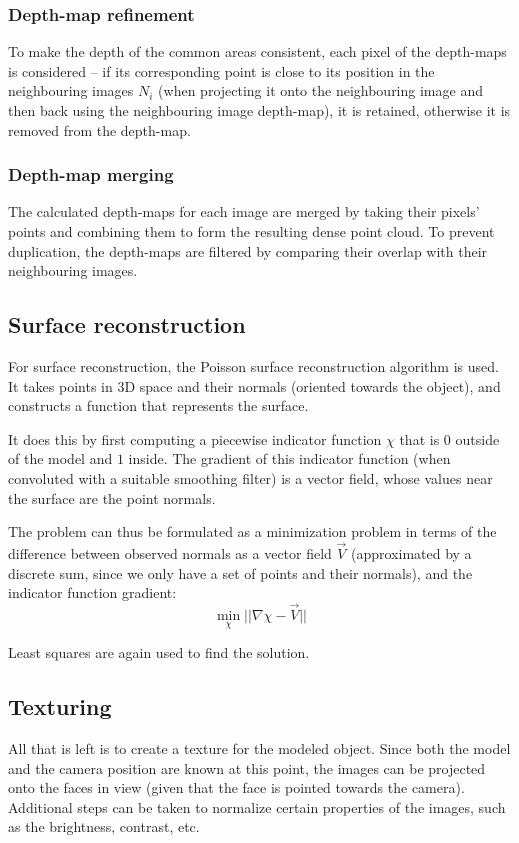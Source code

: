 \subsubsection{Depth-map refinement}
To make the depth of the common areas consistent, each pixel of the depth-maps is considered -- if its corresponding point is close to its position in the neighbouring images $N_i$ (when projecting it onto the neighbouring image and then back using the neighbouring image depth-map), it is retained, otherwise it is removed from the depth-map.

\subsubsection{Depth-map merging}
The calculated depth-maps for each image are merged by taking their pixels' points and combining them to form the resulting dense point cloud.
To prevent duplication, the depth-maps are filtered by comparing their overlap with their neighbouring images.

\subsection{Surface reconstruction}
For surface reconstruction, the Poisson surface reconstruction algorithm \cite{kazhdan2006poisson} is used.
It takes points in 3D space and their normals (oriented towards the object), and constructs a function that represents the surface.

It does this by first computing a piecewise indicator function $\chi$ that is $0$ outside of the model and $1$ inside. The gradient of this indicator function (when convoluted with a suitable smoothing filter) is a vector field, whose values near the surface are the point normals.

The problem can thus be formulated as a minimization problem in terms of the difference between observed normals as a vector field $\vec{V}$ (approximated by a discrete sum, since we only have a set of points and their normals), and the indicator function gradient:
\begin{equation} \min_\chi || \nabla \chi - \vec{V}|| \end{equation}

Least squares are again used to find the solution.

\subsection{Texturing}
All that is left is to create a texture for the modeled object.
Since both the model and the camera position are known at this point, the images can be projected onto the faces in view (given that the face is pointed towards the camera).
Additional steps can be taken to normalize certain properties of the images, such as the brightness, contrast, etc.

